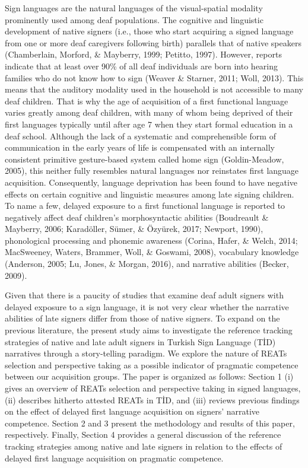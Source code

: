 \documentclass[
  english,
  doc,mask]{apa6}
\begin{document}
Sign languages are the natural languages of the visual-spatial modality prominently used among deaf populations. The cognitive and linguistic development of native signers (i.e., those who start acquiring a signed language from one or more deaf caregivers following birth) parallels that of native speakers (Chamberlain, Morford, \& Mayberry, 1999; Petitto, 1997). However, reports indicate that at least over 90\% of all deaf individuals are born into hearing families who do not know how to sign (Weaver \& Starner, 2011; Woll, 2013). This means that the auditory modality used in the household is not accessible to many deaf children. That is why the age of acquisition of a first functional language varies greatly among deaf children, with many of whom being deprived of their first languages typically until after age 7 when they start formal education in a deaf school. Although the lack of a systematic and comprehensible form of communication in the early years of life is compensated with an internally consistent primitive gesture-based system called home sign (Goldin-Meadow, 2005), this neither fully resembles natural languages nor reinstates first language acquisition. Consequently, language deprivation has been found to have negative effects on certain cognitive and linguistic measures among late signing children. To name a few, delayed exposure to a first functional language is reported to negatively affect deaf children's morphosyntactic abilities (Boudreault \& Mayberry, 2006; Karadöller, Sümer, \& Özyürek, 2017; Newport, 1990), phonological processing and phonemic awareness (Corina, Hafer, \& Welch, 2014; MacSweeney, Waters, Brammer, Woll, \& Goswami, 2008), vocabulary knowledge (Anderson, 2005; Lu, Jones, \& Morgan, 2016), and narrative abilities (Becker, 2009).

Given that there is a paucity of studies that examine deaf adult signers with delayed exposure to a sign language, it is not very clear whether the narrative abilities of late signers differ from those of native signers. To expand on the previous literature, the present study aims to investigate the reference tracking strategies of native and late adult signers in Turkish Sign Language (TİD) narratives through a story-telling paradigm. We explore the nature of REATs selection and perspective taking as a possible indicator of pragmatic competence between our acquisition groups. The paper is organized as follows: Section 1 (i) gives an overview of REATs selection and perspective taking in signed languages, (ii) describes hitherto attested REATs in TİD, and (iii) reviews previous findings on the effect of delayed first language acquisition on signers' narrative competence. Section 2 and 3 present the methodology and results of this paper, respectively. Finally, Section 4 provides a general discussion of the reference tracking strategies among native and late signers in relation to the effects of delayed first language acquisition on pragmatic competence.
\end{document}
